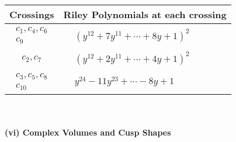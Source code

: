 \documentclass[1p]{elsarticle_modified}
\theoremstyle{definition}
\begin{document}
\begin{tabular}{m{50pt}|m{274pt}}
Crossings & \hspace{64pt}Riley Polynomials at each crossing \\
\hline $$\begin{aligned}c_{1},c_{4},c_{6}\\c_{9}\end{aligned}$$&$\begin{aligned}
&(y^{12}+7 y^{11}+\cdots+8 y+1)^{2}
\end{aligned}$\\
\hline $$\begin{aligned}c_{2},c_{7}\end{aligned}$$&$\begin{aligned}
&(y^{12}+2 y^{11}+\cdots+4 y+1)^{2}
\end{aligned}$\\
\hline $$\begin{aligned}c_{3},c_{5},c_{8}\\c_{10}\end{aligned}$$&$\begin{aligned}
&y^{24}-11 y^{23}+\cdots-8 y+1
\end{aligned}$\\
\hline
\end{tabular}\\~\\
\newpage\flushleft \textbf{(vi) Complex Volumes and Cusp Shapes}
\end{document}
